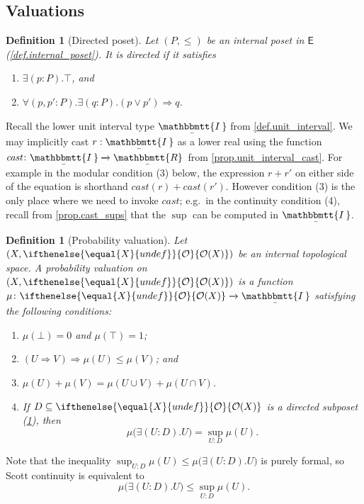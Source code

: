 \documentclass[reqno,11pt]{amsproc}
\theoremstyle{plain}
\newtheorem{definition}[theorem]{Definition}
\theoremstyle{definition}
\newcommand{\cat}[1]{\mathsf{#1}}
\renewcommand{\to}[1][]{\xrightarrow{#1}}
\newcommand{\ubar}[1]{\underaccent{\bar}{#1}}
\newcommand{\internal}[1]{\raisebox{-.03ex}{$\mathbbmtt{#1}$}}
\newcommand{\hs}{\hspace{1pt}}
\newcommand{\trr}{\internal{R}}
\newcommand{\tii}{\ubar{\internal{I\hs\hs}}\!\hs}
\newcommand{\tlrr}{\ubar{\trr}\hs}
\newcommand{\cast}{\textit{cast}}
\newcommand{\Op}[1][undef]{\ifthenelse{\equal{#1}{undef}}{\mathcal{O}}{\mathcal{O}(#1)}}
\newcommand{\imp}{\Rightarrow}
\numberwithin{equation}{section}
\begin{document}
\subsection{Valuations}\label{sec.valuations}

\begin{definition}[Directed poset]\label{def.directed}
Let $(P,\le)$ be an internal poset in $\cat{E}$ (\cref{def.internal_poset}). It is \emph{directed} if it satisfies
\begin{enumerate}
	\item $\exists(p:P).\top$, and
	\item $\forall(p,p':P).\exists(q:P).(p\lor p')\imp q$.
\end{enumerate}
\end{definition}


Recall the lower unit interval type $\tii$ from \cref{def.unit_interval}. We may implicitly cast $r:\tii$ as a lower real using the function $\cast\colon\tii\to\tlrr$ from \cref{prop.unit_interval_cast}. For example in the modular condition (3) below, the expression $r+r'$ on either side of the equation is shorthand $\cast(r)+\cast(r')$. However condition (3) is the only place where we need to invoke $\cast$; e.g.\ in the continuity condition (4), recall from \cref{prop.cast_sups} that the $\sup$ can be computed in $\tii$.

\begin{definition}[Probability valuation]\label{def.prob_valuation}
Let $(X,\Op[X])$ be an internal topological space. A \emph{probability valuation} on $(X,\Op[X])$ is a function $\mu\colon\Op[X]\to\tii$ satisfying the following conditions:
\begin{enumerate}
	\item $\mu(\bot)=0$ and $\mu(\top)=1$;
	\item $(U\imp V)\imp\mu(U)\le\mu(V)$; and
	\item $\mu(U)+\mu(V)=\mu(U\cup V)+\mu(U\cap V)$.
	\item If $D\subseteq\Op[X]$ is a directed subposet (\cref{def.directed}), then
\[
	\mu\big(\exists(U:D).U\big)= \sup_{U: D}\mu(U).
\]
\end{enumerate}
\end{definition}
Note that the inequality $\sup_{U: D}\mu(U)\le\mu\big(\exists(U:D).U\big)$ is purely formal, so Scott continuity is equivalent to
\begin{equation}\label{eqn.scott_continuity}
	\mu\big(\exists(U:D).U\big)\le\sup_{U: D}\mu(U).
\end{equation}
\end{document}
